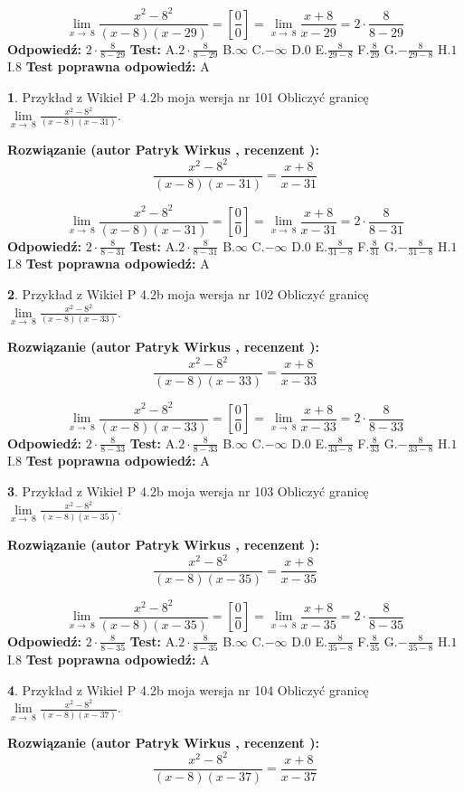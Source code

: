\documentclass[12pt, a4paper]{article}
\theoremstyle{definition} %
\newtheorem{zad}{}
\newcommand{\zadStart}[1]{\begin{zad}#1\newline}
\newcommand{\zadStop}{\end{zad}}
\newcommand{\rozwStart}[2]{\noindent \textbf{Rozwiązanie (autor #1 , recenzent #2): }\newline}
\newcommand{\rozwStop}{\newline}
\newcommand{\odpStart}{\noindent \textbf{Odpowiedź:}\newline}
\newcommand{\odpStop}{\newline}
\newcommand{\testStart}{\noindent \textbf{Test:}\newline}
\newcommand{\testStop}{\newline}
\newcommand{\kluczStart}{\noindent \textbf{Test poprawna odpowiedź:}\newline}
\newcommand{\kluczStop}{\newline}
\begin{document}
$$\lim\limits_{x\to\ 8}\frac{x^{2}-8^{2}}{(x-8)(x-29)}=[\frac{0}{0}]=\lim\limits_{x\to\ 8}\frac{x+8}{x-29}=2 \cdot \frac{8}{8-29}$$
\rozwStop
\odpStart
$2 \cdot \frac{8}{8-29}$
\odpStop
\testStart
A.$2 \cdot \frac{8}{8-29}$
B.$\infty$
C.$-\infty$
D.$0$
E.$\frac{8}{29-8}$
F.$\frac{8}{29}$
G.$-\frac{8}{29-8}$
H.$1$
I.$8$
\testStop
\kluczStart
A
\kluczStop



\zadStart{Przykład z Wikieł P 4.2b moja wersja nr 101}
Obliczyć granicę $\lim\limits_{x\to\ 8}\frac{x^{2}-8^{2}}{(x-8)(x-31)}$.
\zadStop
\rozwStart{Patryk Wirkus}{}
$$\frac{x^{2}-8^{2}}{(x-8)(x-31)}=\frac{x+8}{x-31}$$

$$\lim\limits_{x\to\ 8}\frac{x^{2}-8^{2}}{(x-8)(x-31)}=[\frac{0}{0}]=\lim\limits_{x\to\ 8}\frac{x+8}{x-31}=2 \cdot \frac{8}{8-31}$$
\rozwStop
\odpStart
$2 \cdot \frac{8}{8-31}$
\odpStop
\testStart
A.$2 \cdot \frac{8}{8-31}$
B.$\infty$
C.$-\infty$
D.$0$
E.$\frac{8}{31-8}$
F.$\frac{8}{31}$
G.$-\frac{8}{31-8}$
H.$1$
I.$8$
\testStop
\kluczStart
A
\kluczStop



\zadStart{Przykład z Wikieł P 4.2b moja wersja nr 102}
Obliczyć granicę $\lim\limits_{x\to\ 8}\frac{x^{2}-8^{2}}{(x-8)(x-33)}$.
\zadStop
\rozwStart{Patryk Wirkus}{}
$$\frac{x^{2}-8^{2}}{(x-8)(x-33)}=\frac{x+8}{x-33}$$

$$\lim\limits_{x\to\ 8}\frac{x^{2}-8^{2}}{(x-8)(x-33)}=[\frac{0}{0}]=\lim\limits_{x\to\ 8}\frac{x+8}{x-33}=2 \cdot \frac{8}{8-33}$$
\rozwStop
\odpStart
$2 \cdot \frac{8}{8-33}$
\odpStop
\testStart
A.$2 \cdot \frac{8}{8-33}$
B.$\infty$
C.$-\infty$
D.$0$
E.$\frac{8}{33-8}$
F.$\frac{8}{33}$
G.$-\frac{8}{33-8}$
H.$1$
I.$8$
\testStop
\kluczStart
A
\kluczStop



\zadStart{Przykład z Wikieł P 4.2b moja wersja nr 103}
Obliczyć granicę $\lim\limits_{x\to\ 8}\frac{x^{2}-8^{2}}{(x-8)(x-35)}$.
\zadStop
\rozwStart{Patryk Wirkus}{}
$$\frac{x^{2}-8^{2}}{(x-8)(x-35)}=\frac{x+8}{x-35}$$

$$\lim\limits_{x\to\ 8}\frac{x^{2}-8^{2}}{(x-8)(x-35)}=[\frac{0}{0}]=\lim\limits_{x\to\ 8}\frac{x+8}{x-35}=2 \cdot \frac{8}{8-35}$$
\rozwStop
\odpStart
$2 \cdot \frac{8}{8-35}$
\odpStop
\testStart
A.$2 \cdot \frac{8}{8-35}$
B.$\infty$
C.$-\infty$
D.$0$
E.$\frac{8}{35-8}$
F.$\frac{8}{35}$
G.$-\frac{8}{35-8}$
H.$1$
I.$8$
\testStop
\kluczStart
A
\kluczStop



\zadStart{Przykład z Wikieł P 4.2b moja wersja nr 104}
Obliczyć granicę $\lim\limits_{x\to\ 8}\frac{x^{2}-8^{2}}{(x-8)(x-37)}$.
\zadStop
\rozwStart{Patryk Wirkus}{}
$$\frac{x^{2}-8^{2}}{(x-8)(x-37)}=\frac{x+8}{x-37}$$
\end{document}
